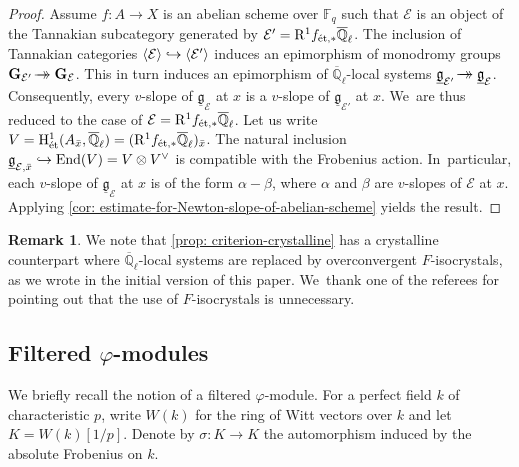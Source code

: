 \documentclass[JEP,XML,SOM,Unicode,published]{cedram}
\newcommand\hto{\mathrel{\lhook\joinrel\to}}
\newcommand{\onto}{\mathchoice{\to\hspace*{-5mm}\to}{\!\to\hspace*{-2.85mm}\to}{\to\hspace*{-3mm}\to}{\to\hspace*{-3mm}\to}}
\numberwithin{equation}{subsection}
\theoremstyle{definition}
\newtheorem{rmk}[thm]{Remark}
\newcommand{\Qlbar}{\overline{\mathbb{Q}}_{\ell}}
\newcommand{\Q}{\mathbb Q}
\begin{document}
\begin{proof}
Assume $f\colon A\to X$ is an abelian scheme over $\mathbb{F}_q$ such that $\mathcal{E}$ is an object of the Tannakian subcategory generated by $\mathcal{E}'=\mathrm{R}^1f_{\textnormal{ét},\ast}\overline{\Q}_\ell$. The inclusion of Tannakian categories $\langle\mathcal{E}\rangle\hto\langle\mathcal{E}'\rangle$ induces an epimorphism of monodromy groups $\mathbf{G}_\mathcal{E'}\onto \mathbf{G}_\mathcal{E}$. This in turn induces an epimorphism of $\overline{\Q}_\ell$-local systems $\underline{\mathfrak{g}}_\mathcal{E'}\onto \underline{\mathfrak{g}}_\mathcal{E}$. Consequently, every $v$-slope of $\underline{\mathfrak{g}}_{\mathcal{E}}$ at $x$ is a $v$-slope of $\underline{\mathfrak{g}}_{\mathcal{E'}}$ at $x$. We~are thus reduced to the case of $\mathcal{E}=\mathrm{R}^1f_{\textnormal{ét},\ast}\overline{\Q}_\ell$. Let us write $V=\mathrm{H}^1_\textnormal{ét}(A_{\bar x},\overline{\Q}_\ell)=(\mathrm{R}^1f_{\textnormal{ét},\ast}\Qlbar)_{\bar x}$. The natural inclusion $\underline{\mathfrak{g}}_{\mathcal{E},\bar x}\hto\mathrm{End}(V)=V\otimes V^\vee$ is compatible with the Frobenius action. In~particular, each $v$-slope of $\underline{\mathfrak{g}}_{\mathcal{E}}$ at $x$ is of the form $\alpha-\beta$, where $\alpha$ and $\beta$ are $v$-slopes of $\mathcal{E}$ at $x$. Applying \cref{cor: estimate-for-Newton-slope-of-abelian-scheme} yields the result.
\end{proof}

\begin{rmk}
We note that \cref{prop: criterion-crystalline} has a crystalline counterpart where $\Qlbar$-local systems are replaced by overconvergent $F$-isocrystals, as we wrote in the initial version of this paper. We~thank one of the referees for pointing out that the use of $F$-isocrystals is unnecessary.
\end{rmk}

\subsection{Filtered \texorpdfstring{$\varphi$}{phi}-modules}
We briefly recall the notion of a filtered $\varphi$-module. For a perfect field $k$ of characteristic $p$, write $W(k)$ for the ring of Witt vectors over $k$ and let $K=W(k)[1/p]$. Denote by $\sigma: K\rightarrow K$ the automorphism induced by the absolute Frobenius on $k$.
\end{document}
